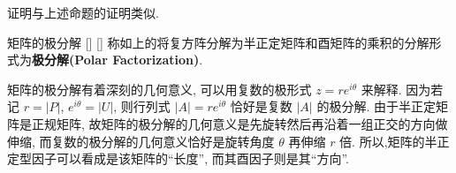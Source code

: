\documentclass[UTF8]{ctexart}
\DeclareMathOperator{\0}{\mathbf{0}}
\DeclareMathOperator{\<}{\langle}
\renewcommand{\>}{\rangle}
\begin{document}
		证明与上述命题的证明类似. 

		\begin{dfn}
			[]
			{矩阵的极分解}
			[]
			[]
			称如上的将复方阵分解为半正定矩阵和酉矩阵的乘积的分解形式为\textbf{极分解(Polar Factorization)}.
		\end{dfn}

		矩阵的极分解有着深刻的几何意义, 可以用复数的极形式 \(z=re^{i\theta}\) 来解释. 因为若记 \(r=|P|\),  \(e^{i\theta}=|U|\), 则行列式 \(|A| =re^{i\theta}\) 恰好是复数 \(|A|\) 的极分解. 由于半正定矩阵是正规矩阵, 故矩阵的极分解的几何意义是先旋转然后再沿着一组正交的方向做伸缩, 而复数的极分解的几何意义恰好是旋转角度 \(\theta\) 再伸缩 \(r\) 倍. 所以,矩阵的半正定型因子可以看成是该矩阵的“长度”, 而其酉因子则是其“方向”. 
\end{document}
